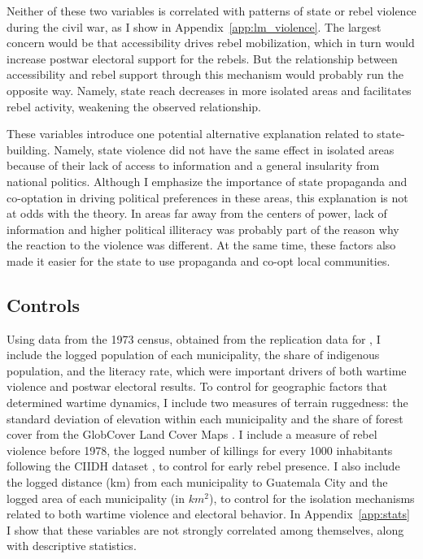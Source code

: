 \documentclass[12pt, notitlepage]{article}
\begin{document}
Neither of these two variables is correlated with patterns of state or rebel violence during the civil war, as I show in Appendix~\ref{app:lm_violence}.
The largest concern would be that accessibility drives rebel mobilization, which in turn would increase postwar electoral support for the rebels.
But the relationship between accessibility and rebel support through this mechanism would probably run the opposite way.
Namely, state reach decreases in more isolated areas and facilitates rebel activity, weakening the observed relationship.

These variables introduce one potential alternative explanation related to state-building.
Namely, state violence did not have the same effect in isolated areas because of their lack of access to information and a general insularity from national politics.
Although I emphasize the importance of state propaganda and co-optation in driving political preferences in these areas, this explanation is not at odds with the theory.
In areas far away from the centers of power, lack of information and higher political illiteracy was probably part of the reason why the reaction to the violence was different.
At the same time, these factors also made it easier for the state to use propaganda and co-opt local communities.

\subsection*{Controls}

Using data from the 1973 census, obtained from the replication data for \citet{Sullivan:2012aa}, I include the logged population of each municipality, the share of indigenous population, and the literacy rate, which were important drivers of both wartime violence and postwar electoral results.
To control for geographic factors that determined wartime dynamics, I include two measures of terrain ruggedness: the standard deviation of elevation within each municipality \citep{Mapzen:2018aa} and the share of forest cover from the GlobCover Land Cover Maps \citep{Arino:2012aa}.
I include a measure of rebel violence before 1978, the logged number of killings for every 1000 inhabitants following the CIIDH dataset \citep{Ball:1999aa}, to control for early rebel presence.
I also include the logged distance (km) from each municipality to Guatemala City and the logged area of each municipality (in $km^2$), to control for the isolation mechanisms related to both wartime violence and electoral behavior.
In Appendix~\ref{app:stats} I show that these variables are not strongly correlated among themselves, along with descriptive statistics.
\end{document}
